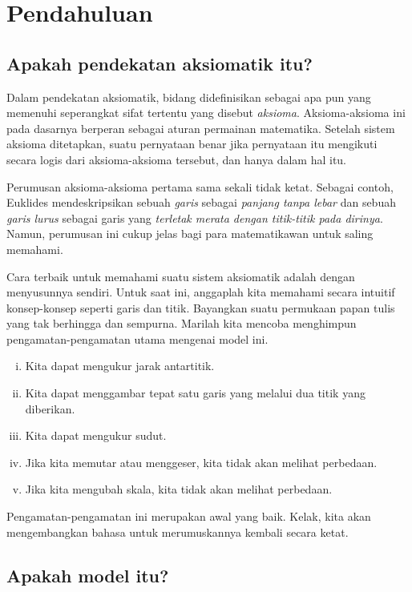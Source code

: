 \chapter{Pendahuluan}\label{chap:metr}


\section{Apakah pendekatan aksiomatik itu?}
\label{preaxioms}

Dalam pendekatan aksiomatik, bidang didefinisikan sebagai apa pun yang memenuhi seperangkat sifat tertentu yang disebut {}\emph{aksioma}.
Aksioma-aksioma ini pada dasarnya berperan sebagai aturan permainan matematika.
Setelah sistem aksioma ditetapkan, suatu pernyataan benar jika pernyataan itu mengikuti secara logis dari aksioma-aksioma tersebut, dan hanya dalam hal itu.

Perumusan aksioma-aksioma pertama sama sekali tidak ketat.
Sebagai contoh, Euklides mendeskripsikan sebuah {}\emph{garis} sebagai \textit{panjang tanpa lebar}
dan sebuah {}\emph{garis lurus} sebagai garis yang \textit{terletak merata dengan titik-titik pada dirinya}.
Namun, perumusan ini cukup jelas bagi para matematikawan untuk saling memahami.

Cara terbaik untuk memahami suatu sistem aksiomatik
adalah dengan menyusunnya sendiri.
Untuk saat ini, anggaplah kita memahami secara intuitif konsep-konsep seperti garis dan titik.
Bayangkan suatu permukaan papan tulis yang tak berhingga dan sempurna. 
Marilah kita mencoba menghimpun pengamatan-pengamatan utama mengenai model ini.

\begin{enumerate}[(i)]
 \item\label{preaxiomI} Kita dapat mengukur jarak antartitik.
 \item\label{preaxiomII} Kita dapat menggambar tepat satu garis yang melalui dua titik yang diberikan.
 \item\label{preaxiomIII} Kita dapat mengukur sudut.
 \item\label{preaxiomIV} Jika kita memutar atau menggeser, kita tidak akan melihat perbedaan.
 \item\label{preaxiomV} Jika kita mengubah skala, kita tidak akan melihat perbedaan.
\end{enumerate}
Pengamatan-pengamatan ini merupakan awal yang baik.
Kelak, kita akan mengembangkan bahasa untuk merumuskannya kembali secara ketat.

\section{Apakah model itu?}
\label{page:model}

